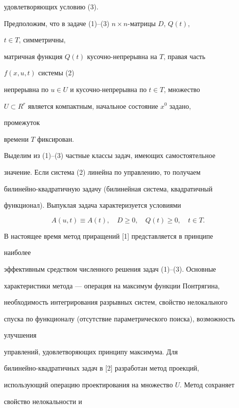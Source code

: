 удовлетворяющих условию (3). 


Предположим, что в задаче (1)--(3)\; $n\times n$-матрицы $D$, $Q(t)$, 


$t\in T$, симметричны, 


матричная функция $Q(t)$ кусочно-непрерывна на $T$, правая часть 


$f(x,u,t)$ системы (2) 


непрерывна по $u\in U$ и кусочно-непрерывна по $t\in T$, множество 


$U\subset R^r$ является компактным, начальное состояние $x^0$ задано, 


промежуток 


времени $T$ фиксирован. 


 


Выделим из (1)--(3) частные классы задач, имеющих самостоятельное 


значение. Если система (2) линейна по управлению, то получаем 


билинейно-квадратичную задачу (билинейная система, квадратичный 


функционал). Выпуклая задача характеризуется условиями 


\begin{equation} 


A(u,t)\equiv A(t),\quad D\ge 0,\quad Q(t)\ge 0,\quad t\in T. 


\end{equation} 


В настоящее время метод приращений [1] представляется в принципе 


наиболее 


эффективным средством численного решения задач (1)--(3). Основные 


характеристики метода --- операция на максимум функции Понтрягина, 


необходимость интегрирования разрывных систем, свойство нелокального 


спуска по функционалу (отсутствие параметрического поиска), возможность 


улучшения 


управлений, удовлетворяющих принципу максимума. Для 


билинейно-квадратичных задач в [2] разработан метод проекций, 


использующий операцию проектирования на множество $U$. Метод сохраняет 


свойство нелокальности и 


